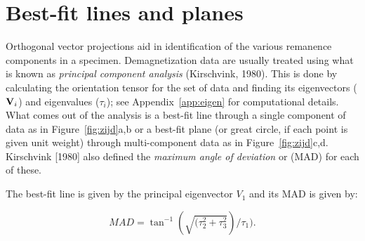   \nocite{dupont-nivet02}


\section {Best-fit lines and planes}
\label{sect:BFL}

%
 Orthogonal vector projections aid in   identification
of the various remanence
components in a specimen.  Demagnetization data are usually
treated using  what is known as 
 {\it principal component analysis} 
(Kirschvink, 1980).  \nocite{kirschvink80} 
This is done by calculating the orientation tensor for the set of data and finding its eigenvectors ($\hbox{\bf V}_i$) and eigenvalues ($\tau_i$); see Appendix~\ref{app:eigen} for computational details.  
What comes out of the analysis is a best-fit line through a single component of data  as in 
Figure~\ref{fig:zijd}a,b or a best-fit plane (or great circle, if each point is given unit weight)   through multi-component data as in Figure~\ref{fig:zijd}c,d.   
Kirschvink [1980]  also defined the 
{\it maximum angle of deviation} or (MAD) for each of these. 

The best-fit line is given by the principal eigenvector $V_1$ and  its MAD  is given by:  

\begin{equation}
MAD = \tan^{-1}(\sqrt{(\tau_2^2+\tau_3^2})/{\tau_1}).
\label{eq:mad}
\end{equation}


